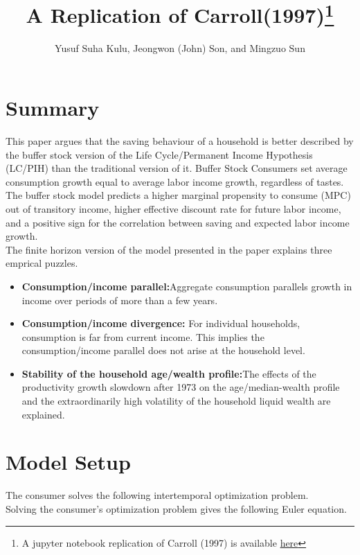 \documentclass[]{article}
\title{A Replication of Carroll(1997)\protect\footnote{A jupyter notebook replication of Carroll (1997) is available \href{https://github.com/sonjeongwon621/project-with-yusuf/blob/master/Carroll_1997_RemARK.ipynb}{here}}}
\author{Yusuf Suha Kulu, Jeongwon (John) Son, and Mingzuo Sun}
\date{}
\providecommand{\EqDir}{Equations}
\begin{document}
\setlength\parindent{0pt}

\maketitle

\section{Summary}

This paper argues that the saving behaviour of a household is better described by the buffer stock version of the Life Cycle/Permanent Income Hypothesis (LC/PIH) than the traditional version of it. Buffer Stock Consumers set average consumption growth equal to average labor income growth, regardless of tastes. The buffer stock model predicts a higher marginal propensity to consume (MPC) out of transitory income, higher effective discount rate for future labor income, and a positive sign for the correlation between saving and expected labor income growth.\\

The finite horizon version of the model presented in the paper explains three emprical puzzles.
\begin{itemize}
\item \textbf{Consumption/income parallel:}Aggregate consumption parallels growth in income over periods of more than a few years.
\item \textbf{Consumption/income divergence:} For individual households, consumption is far from current income. This implies the consumption/income parallel does not arise at the household level.
\item \textbf{Stability of the household age/wealth profile:}The effects of the productivity growth slowdown after 1973 on the age/median-wealth profile and the extraordinarily high volatility of the household liquid wealth are explained. 
\end{itemize}

\newpage 

\section{Model Setup}

The consumer solves the following intertemporal optimization problem.\\


Solving the consumer's optimization problem gives the following Euler equation.\\

\end{document}
